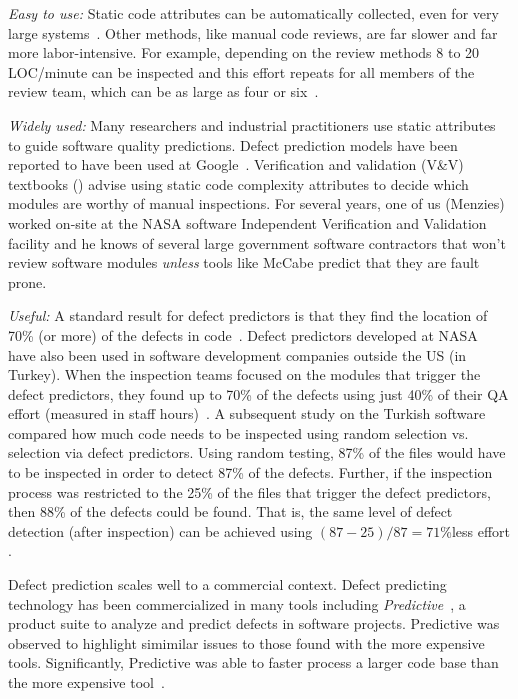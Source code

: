 {\em Easy to use:} Static code attributes can be automatically collected, even for very large systems~\cite{nagappan05}.
Other methods, like  manual code reviews, are far slower and far more labor-intensive.
For example, depending on the review methods 8 to 20 LOC/minute can be
inspected and this effort repeats for all members of the review team,
which can be as large as four or six~\cite{me02f}. 

{\em Widely used:} Many researchers and industrial practitioners  use static attributes to guide software 
quality predictions.
 Defect prediction models have been reported
to have been used at Google~\cite{lewis13}.
Verification and validation (V\&V) textbooks
(\cite{rakitin01}) advise using static code complexity attributes
to decide which modules are worthy of manual inspections.  
For several  years, one of us (Menzies) worked on-site at the NASA software Independent Verification
and Validation facility
and he
knows of several large government software contractors that won't
review software modules {\em unless} tools like McCabe predict that
they are fault prone.  


{\em Useful:}
A
standard result for defect predictors is that they find the location of  70\% (or more)
of the defects in code~\cite{me07b}.
Defect predictors developed at NASA~\cite{me07b} have also been used in software development companies outside the US (in Turkey). When the inspection teams focused on the modules that trigger the defect predictors, they found up to 70\% of the defects using just 40\% of their QA effort (measured in staff hours)~\cite{tosun10}.
A subsequent study on the Turkish software
compared how much code needs to be inspected using
random selection vs. selection via defect
predictors. Using random testing, 87\% of the files
would have to be inspected in order to detect 87\%
of the defects. Further, if the inspection process
was restricted to the 25\% of the files that trigger
the defect predictors, then 88\% of the defects
could be found. That is, the same level of defect
detection (after inspection) can be achieved using
$(87-25)/87=71$\%less effort
\cite{tosun09}.


Defect prediction scales well to a commercial
context. Defect predicting technology has been
commercialized in many tools including {\it Predictive}~\cite{turner06}, a
 product suite to analyze and predict
defects in software projects. Predictive was observed to
highlight simimilar issues to those found   with the more expensive tools. Significantly,
Predictive was able to faster process a larger code
base than the more expensive tool~\cite{turner06}.

